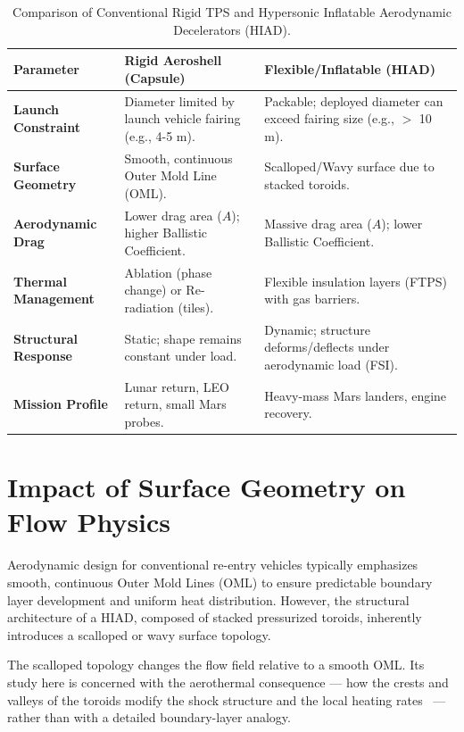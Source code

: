 \begin{table}[H]
    \centering
    \caption{Comparison of Conventional Rigid TPS and Hypersonic Inflatable Aerodynamic Decelerators (HIAD).}
    \label{tab:tps_comparison}
    \begin{tabularx}{\textwidth}{|l|X|X|}
        \hline
        \rowcolor{gray!20} \textbf{Parameter} & \textbf{Rigid Aeroshell (Capsule)} & \textbf{Flexible/Inflatable (HIAD)} \\ \hline
        \textbf{Launch Constraint} & Diameter limited by launch vehicle fairing (e.g., 4-5 m). & Packable; deployed diameter can exceed fairing size (e.g., $>$ 10 m). \\ \hline
        \textbf{Surface Geometry} & Smooth, continuous Outer Mold Line (OML). & Scalloped/Wavy surface due to stacked toroids. \\ \hline
        \textbf{Aerodynamic Drag} & Lower drag area ($A$); higher Ballistic Coefficient. & Massive drag area ($A$); lower Ballistic Coefficient. \\ \hline
        \textbf{Thermal Management} & Ablation (phase change) or Re-radiation (tiles). & Flexible insulation layers (FTPS) with gas barriers. \\ \hline
        \textbf{Structural Response} & Static; shape remains constant under load. & Dynamic; structure deforms/deflects under aerodynamic load (FSI). \\ \hline %
        \textbf{Mission Profile} & Lunar return, LEO return, small Mars probes. & Heavy-mass Mars landers, engine recovery. \\ \hline
    \end{tabularx}
\end{table}
\section{Impact of Surface Geometry on Flow Physics}
Aerodynamic design for conventional re-entry vehicles typically emphasizes smooth, continuous Outer Mold Lines (OML) to ensure predictable boundary layer development and uniform heat distribution. However, the structural architecture of a HIAD, composed of stacked pressurized toroids, inherently introduces a scalloped or wavy surface topology.
\par
The scalloped topology changes the flow field relative to a smooth OML. Its study here is concerned with the aerothermal consequence --- how the crests and valleys of the toroids modify the shock structure and the local heating rates~\cite{white2006viscous} --- rather than with a detailed boundary-layer analogy.

